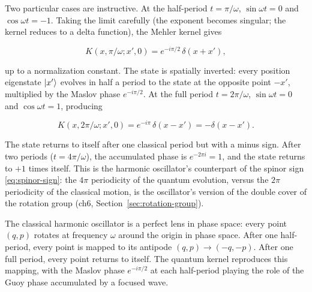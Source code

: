 Two particular cases are instructive. At the half-period $t = \pi/\omega$, $\sin\omega t = 0$ and $\cos\omega t = -1$. Taking the limit carefully (the exponent becomes singular; the kernel reduces to a delta function), the Mehler kernel gives
\begin{linenomath}
\begin{equation}
K(x,\pi/\omega;x',0) = e^{-i\pi/2}\,\delta(x + x'),
\end{equation}
\end{linenomath}
up to a normalization constant. The state is spatially inverted: every position eigenstate $\ket{x'}$ evolves in half a period to the state at the opposite point $-x'$, multiplied by the Maslov phase $e^{-i\pi/2}$. At the full period $t = 2\pi/\omega$, $\sin\omega t = 0$ and $\cos\omega t = 1$, producing
\begin{linenomath}
\begin{equation}
K(x,2\pi/\omega;x',0) = e^{-i\pi}\,\delta(x - x') = -\delta(x - x').
\end{equation}
\end{linenomath}
The state returns to itself after one classical period but with a minus sign. After two periods ($t = 4\pi/\omega$), the accumulated phase is $e^{-2\pi i} = 1$, and the state returns to $+1$ times itself. This is the harmonic oscillator's counterpart of the spinor sign \eqref{eq:spinor-sign}: the $4\pi$ periodicity of the quantum evolution, versus the $2\pi$ periodicity of the classical motion, is the oscillator's version of the double cover of the rotation group (ch6, Section~\ref{sec:rotation-group}).

\begin{note}
The classical harmonic oscillator is a perfect lens in phase space: every point $(q,p)$ rotates at frequency $\omega$ around the origin in phase space. After one half-period, every point is mapped to its antipode $(q,p) \to (-q,-p)$. After one full period, every point returns to itself. The quantum kernel reproduces this mapping, with the Maslov phase $e^{-i\pi/2}$ at each half-period playing the role of the Guoy phase accumulated by a focused wave.
\end{note}

